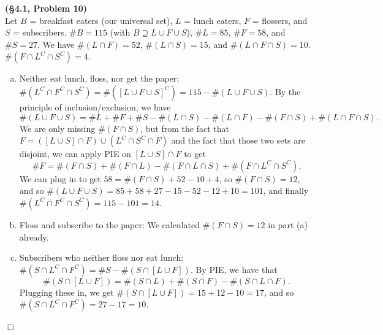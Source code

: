 \documentclass[12pt]{article}
\theoremstyle{definition}
\newenvironment{Solution}{\noindent {\sc Solution.}}{$\Box$ \vspace{2 ex}}
\begin{document}
\begin{Solution}
{\bf (\S4.1, Problem 10)}\\
Let $B$ = breakfast eaters (our universal set), $L$ = lunch eaters, $F$ = flossers, and $S$ = subscribers. $\#B = 115$ (with $B \supseteq L \cup F\cup S$), $\#L = 85$, $\#F = 58$, and $\#S = 27$. We have $\#(L \cap F) = 52$, $\#(L \cap S) = 15$, and $\#(L \cap F \cap S) = 10$. $\#(F \cap L^C \cap S^C)=4$.
\begin{enumerate}[(a)]
\item Neither eat lunch, floss, nor get the paper: $\#(L^C \cap F^C \cap S^C)=\#\left([L\cup F \cup S]^C\right) = 115 - \# (L \cup F\cup S)$. By the principle of inclusion/exclusion, we have \[\#(L \cup F \cup S) = \# L + \# F + \# S - \# (L \cap S) - \# (L \cap F)-\#(F \cap  S) + \# (L \cap F \cap S).\]
We are only missing $\#(F\cap S)$, but from the fact that $F = ([L\cup S] \cap F) \cup (L^C \cap S^C \cap F)$ and the fact that those two sets are disjoint, we can apply PIE on $[L \cup S]\cap F$ to get \[\# F = \#(F \cap S) + \#(F \cap L) - \# (F\cap L\cap S) + \#(F\cap L^C \cap S^C).\]
We can plug in to get $58=\#(F \cap S) +52 - 10 + 4$, so $\#(F\cap S) = 12$, and so $\#(L \cup F \cup S) = 85+58+27-15-52-12+10=101$, and finally $\#(L^C\cap F^C\cap S^C)=115-101=14$.
\item Floss and subscribe to the paper: We calculated $\#(F\cap S)=12$ in part (a) already.
\item Subscribers who neither floss nor eat lunch: $\#(S \cap L^C \cap F^C) = \#S -\#(S\cap [L\cup F])$. By PIE, we have that \[\#(S\cap [L \cup F]) = \# (S\cap L)+\# (S\cap F) -\#(S\cap L\cap F).\]
Plugging these in, we get $\#(S\cap [L \cup F])=15+12-10=17$, and so $\#(S\cap L^C\cap F^C)=27-17=10$.
\end{enumerate}
\end{Solution}
\end{document}
